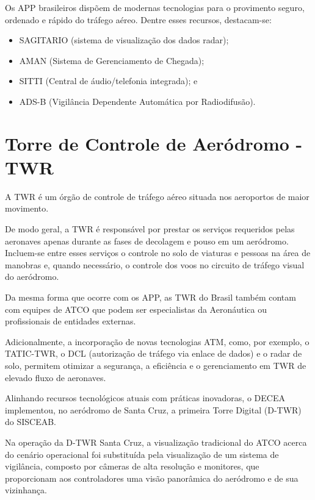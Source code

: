 \documentclass[
]{book}
\providecommand{\tightlist}{%
  \setlength{\itemsep}{0pt}\setlength{\parskip}{0pt}}
\theoremstyle{definition}
\theoremstyle{definition}
\theoremstyle{definition}
\theoremstyle{definition}
\theoremstyle{remark}
\begin{document}
Os APP brasileiros dispõem de modernas tecnologias para o provimento seguro, ordenado e rápido do tráfego aéreo. Dentre esses recursos, destacam-se:

\begin{itemize}
\tightlist
\item
  SAGITARIO (sistema de visualização dos dados radar);
\item
  AMAN (Sistema de Gerenciamento de Chegada);
\item
  SITTI (Central de áudio/telefonia integrada); e
\item
  ADS-B (Vigilância Dependente Automática por Radiodifusão).
\end{itemize}

\hypertarget{torre-de-controle-de-aeruxf3dromo---twr}{%
\section{Torre de Controle de Aeródromo - TWR}\label{torre-de-controle-de-aeruxf3dromo---twr}}

A TWR é um órgão de controle de tráfego aéreo situada nos aeroportos de maior movimento.

De modo geral, a TWR é responsável por prestar os serviços requeridos pelas aeronaves apenas durante as fases de decolagem e pouso em um aeródromo. Incluem-se entre esses serviços o controle no solo de viaturas e pessoas na área de manobras e, quando necessário, o controle dos voos no circuito de tráfego visual do aeródromo.

Da mesma forma que ocorre com os APP, as TWR do Brasil também contam com equipes de ATCO que podem ser especialistas da Aeronáutica ou profissionais de entidades externas.

Adicionalmente, a incorporação de novas tecnologias ATM, como, por exemplo, o TATIC-TWR, o DCL (autorização de tráfego via enlace de dados) e o radar de solo, permitem otimizar a segurança, a eficiência e o gerenciamento em TWR de elevado fluxo de aeronaves.

Alinhando recursos tecnológicos atuais com práticas inovadoras, o DECEA implementou, no aeródromo de Santa Cruz, a primeira Torre Digital (D-TWR) do SISCEAB.

Na operação da D-TWR Santa Cruz, a visualização tradicional do ATCO acerca do cenário operacional foi substituída pela visualização de um sistema de vigilância, composto por câmeras de alta resolução e monitores, que proporcionam aos controladores uma visão panorâmica do aeródromo e de sua vizinhança.
\end{document}

